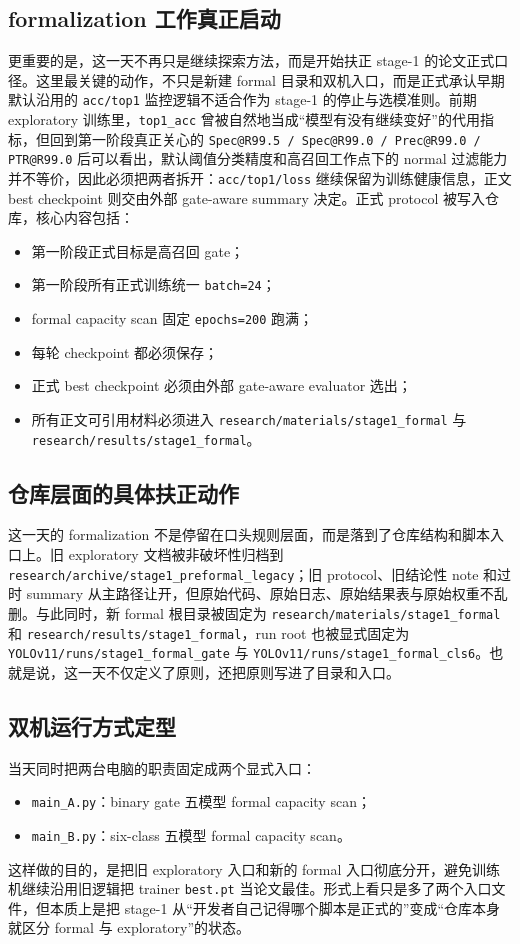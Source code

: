 \documentclass[UTF8,12pt]{ctexart}
\begin{document}
\subsection{formalization 工作真正启动}
更重要的是，这一天不再只是继续探索方法，而是开始扶正 stage-1 的论文正式口径。这里最关键的动作，不只是新建 formal 目录和双机入口，而是正式承认早期默认沿用的 \texttt{acc/top1} 监控逻辑不适合作为 stage-1 的停止与选模准则。前期 exploratory 训练里，\texttt{top1\_acc} 曾被自然地当成“模型有没有继续变好”的代用指标，但回到第一阶段真正关心的 \texttt{Spec@R99.5 / Spec@R99.0 / Prec@R99.0 / PTR@R99.0} 后可以看出，默认阈值分类精度和高召回工作点下的 normal 过滤能力并不等价，因此必须把两者拆开：\texttt{acc/top1/loss} 继续保留为训练健康信息，正文 best checkpoint 则交由外部 gate-aware summary 决定。正式 protocol 被写入仓库，核心内容包括：
\begin{itemize}
    \item 第一阶段正式目标是高召回 gate；
    \item 第一阶段所有正式训练统一 \texttt{batch=24}；
    \item formal capacity scan 固定 \texttt{epochs=200} 跑满；
    \item 每轮 checkpoint 都必须保存；
    \item 正式 best checkpoint 必须由外部 gate-aware evaluator 选出；
    \item 所有正文可引用材料必须进入 \texttt{research/materials/stage1\_formal} 与 \texttt{research/results/stage1\_formal}。
\end{itemize}

\subsection{仓库层面的具体扶正动作}
这一天的 formalization 不是停留在口头规则层面，而是落到了仓库结构和脚本入口上。旧 exploratory 文档被非破坏性归档到 \texttt{research/archive/stage1\_preformal\_legacy}；旧 protocol、旧结论性 note 和过时 summary 从主路径让开，但原始代码、原始日志、原始结果表与原始权重不乱删。与此同时，新 formal 根目录被固定为 \texttt{research/materials/stage1\_formal} 和 \texttt{research/results/stage1\_formal}，run root 也被显式固定为 \texttt{YOLOv11/runs/stage1\_formal\_gate} 与 \texttt{YOLOv11/runs/stage1\_formal\_cls6}。也就是说，这一天不仅定义了原则，还把原则写进了目录和入口。

\subsection{双机运行方式定型}
当天同时把两台电脑的职责固定成两个显式入口：
\begin{itemize}
    \item \texttt{main\_A.py}：binary gate 五模型 formal capacity scan；
    \item \texttt{main\_B.py}：six-class 五模型 formal capacity scan。
\end{itemize}
这样做的目的，是把旧 exploratory 入口和新的 formal 入口彻底分开，避免训练机继续沿用旧逻辑把 trainer \texttt{best.pt} 当论文最佳。形式上看只是多了两个入口文件，但本质上是把 stage-1 从“开发者自己记得哪个脚本是正式的”变成“仓库本身就区分 formal 与 exploratory”的状态。
\end{document}
